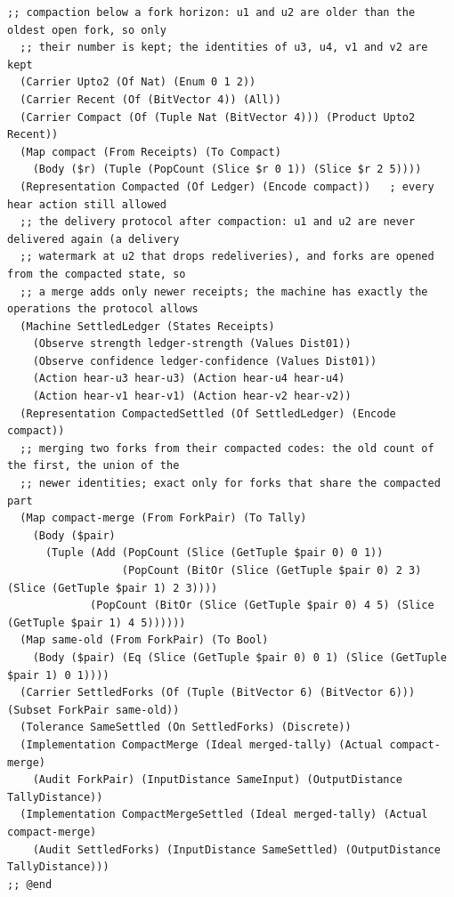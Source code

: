 \documentclass[11pt]{article}
\theoremstyle{definition}
\theoremstyle{plain}
\begin{document}
\begin{lstlisting}[style=mettafull]
  ;; compaction below a fork horizon: u1 and u2 are older than the oldest open fork, so only
  ;; their number is kept; the identities of u3, u4, v1 and v2 are kept
  (Carrier Upto2 (Of Nat) (Enum 0 1 2))
  (Carrier Recent (Of (BitVector 4)) (All))
  (Carrier Compact (Of (Tuple Nat (BitVector 4))) (Product Upto2 Recent))
  (Map compact (From Receipts) (To Compact)
    (Body ($r) (Tuple (PopCount (Slice $r 0 1)) (Slice $r 2 5))))
  (Representation Compacted (Of Ledger) (Encode compact))   ; every hear action still allowed
  ;; the delivery protocol after compaction: u1 and u2 are never delivered again (a delivery
  ;; watermark at u2 that drops redeliveries), and forks are opened from the compacted state, so
  ;; a merge adds only newer receipts; the machine has exactly the operations the protocol allows
  (Machine SettledLedger (States Receipts)
    (Observe strength ledger-strength (Values Dist01))
    (Observe confidence ledger-confidence (Values Dist01))
    (Action hear-u3 hear-u3) (Action hear-u4 hear-u4)
    (Action hear-v1 hear-v1) (Action hear-v2 hear-v2))
  (Representation CompactedSettled (Of SettledLedger) (Encode compact))
  ;; merging two forks from their compacted codes: the old count of the first, the union of the
  ;; newer identities; exact only for forks that share the compacted part
  (Map compact-merge (From ForkPair) (To Tally)
    (Body ($pair)
      (Tuple (Add (PopCount (Slice (GetTuple $pair 0) 0 1))
                  (PopCount (BitOr (Slice (GetTuple $pair 0) 2 3) (Slice (GetTuple $pair 1) 2 3))))
             (PopCount (BitOr (Slice (GetTuple $pair 0) 4 5) (Slice (GetTuple $pair 1) 4 5))))))
  (Map same-old (From ForkPair) (To Bool)
    (Body ($pair) (Eq (Slice (GetTuple $pair 0) 0 1) (Slice (GetTuple $pair 1) 0 1))))
  (Carrier SettledForks (Of (Tuple (BitVector 6) (BitVector 6))) (Subset ForkPair same-old))
  (Tolerance SameSettled (On SettledForks) (Discrete))
  (Implementation CompactMerge (Ideal merged-tally) (Actual compact-merge)
    (Audit ForkPair) (InputDistance SameInput) (OutputDistance TallyDistance))
  (Implementation CompactMergeSettled (Ideal merged-tally) (Actual compact-merge)
    (Audit SettledForks) (InputDistance SameSettled) (OutputDistance TallyDistance)))
;; @end


\end{lstlisting}
\end{document}
